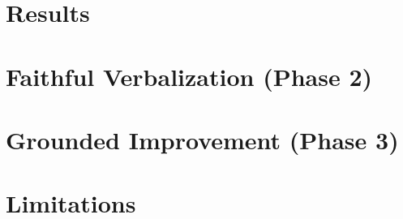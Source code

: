 \section{Results}

\section{Faithful Verbalization (Phase 2)}

\section{Grounded Improvement (Phase 3)}

\section{Limitations}
